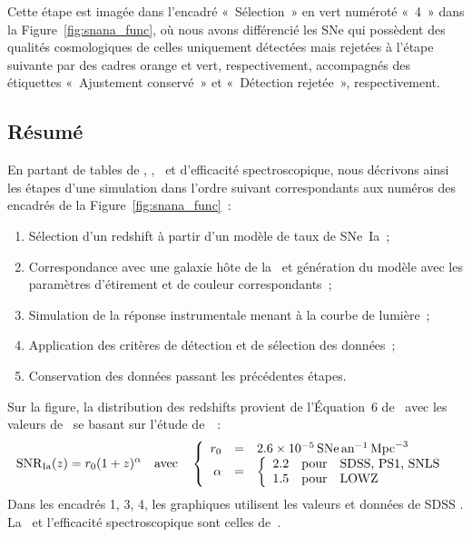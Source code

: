 \documentclass[../main/main.tex]{subfiles}
\begin{document}
Cette étape est imagée dans l'encadré «~Sélection~» en vert numéroté «~4~» dans
la Figure~\ref{fig:snana_func}, où nous avons différencié les SNe qui possèdent
des qualités cosmologiques de celles uniquement détectées
mais rejetées à l'étape suivante par des cadres orange et vert, respectivement,
accompagnés des étiquettes «~Ajustement conservé~» et «~Détection rejetée~»,
respectivement.

\subsection{Résumé}\label{ssec:simshort}

En partant de tables de \hostlib, \simlib, \wgtmap\ et d'efficacité
spectroscopique, nous décrivons ainsi les étapes d'une simulation dans l'ordre
suivant correspondants aux numéros des encadrés de la
Figure~\ref{fig:snana_func}~:
\begin{enumerate}
    \item Sélection d'un redshift à partir d'un modèle de taux de SNe~Ia~;
    \item Correspondance avec une galaxie hôte de la \hostlib\ et génération du
        modèle avec les paramètres d'étirement et de couleur correspondants~;
    \item Simulation de la réponse instrumentale menant à la courbe de lumière~;
    \item Application des critères de détection et de sélection des données~;
    \item Conservation des données passant les précédentes étapes.
\end{enumerate}
Sur la figure, la distribution des redshifts provient de l'Équation~6
de~\cite{perrett2012} avec les valeurs de~\cite{popovic2021a} se basant sur
l'étude de~\cite{scolnic2018}~:
\begin{equation}
    \mathrm{SNR}_{\rm Ia}(z) = r_0(1+z)^{\alpha}\quad\text{avec}\quad \left\{
        \begin{array}{rcl}
            r_0 & = & \SI{2.6e-5}{SNe.an^{-1}.Mpc^{-3}} \\
            \alpha & = &
            \left\{
                \begin{array}{rcl}
                    \num{2.2} & \text{pour} & \text{SDSS, PS1, SNLS}\\
                    \num{1.5} & \text{pour} & \text{LOWZ}
                \end{array}
            \right.
        \end{array}
    \right.
\end{equation}
Dans les encadrés 1, 3, 4, les graphiques utilisent les valeurs et données de
SDSS \citep{sako2018}. La \wgtmap\ et l'efficacité spectroscopique sont celles
de~\cite{popovic2021a}.
\end{document}
